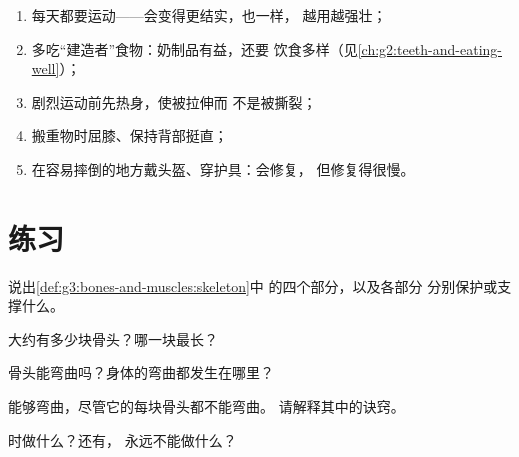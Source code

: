\begin{method}[爱护骨骼和肌肉]\label{met:g3:bones-and-muscles:care}
\begin{enumerate}
  \item 每天都要运动——会变得更结实，也一样，
        越用越强壮；
  \item 多吃“建造者”食物：奶制品有益，还要
        饮食多样（见\cref{ch:g2:teeth-and-eating-well}）；
  \item 剧烈运动前先热身，使被拉伸而
        不是被撕裂；
  \item 搬重物时屈膝、保持背部挺直；
  \item 在容易摔倒的地方戴头盔、穿护具：会修复，
        但修复得很慢。
\end{enumerate}
\end{method}

\section{练习}

\begin{exercise}[$\star$]\label{exo:g3:bones-and-muscles:1}
说出\cref{def:g3:bones-and-muscles:skeleton}中
的四个部分，以及各部分
分别保护或支撑什么。
\end{exercise}

\begin{exercise}[$\star$]\label{exo:g3:bones-and-muscles:2}
大约有多少块骨头？哪一块最长？
\end{exercise}

\begin{exercise}[$\star$]\label{exo:g3:bones-and-muscles:3}
骨头能弯曲吗？身体的弯曲都发生在哪里？
\end{exercise}

\begin{exercise}[$\star$]\label{exo:g3:bones-and-muscles:4}
能够弯曲，尽管它的每块骨头都不能弯曲。
请解释其中的诀窍。
\end{exercise}

\begin{exercise}[$\star$]\label{exo:g3:bones-and-muscles:5}
时做什么？还有，
永远不能做什么？
\end{exercise}

